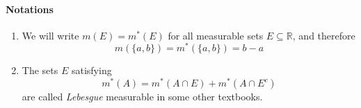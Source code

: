 \paragraph{Notations}

\begin{enumerate}
\item
We will write $m(E)=m^*(E)$ for all measurable sets $E\subseteq\mathbb{R}$, and therefore
\[
m(\{a,b\}) = m^*(\{a,b\})=b-a
\]
\item
The sets $E$ satisfying
\[
m^*(A) = m^*(A\cap E)+m^*(A\cap E^c)
\]
are called \emph{Lebesgue} measurable in some other textbooks.
\end{enumerate}


















